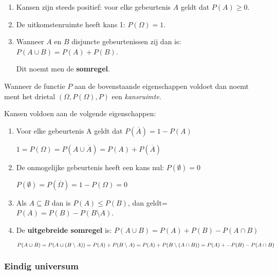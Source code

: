 \documentclass[a4paper,12pt]{article}
\begin{document}
\begin{enumerate}
\item Kansen zijn steeds positief: voor elke gebeurtenis $A$ geldt dat $P(A) \geq 0$.
\item De uitkomstenruimte heeft kans 1: $P(\Omega)=1$.
\item Wanneer $A$ en $B$ disjuncte gebeurtenissen zij dan is: $P(A\cup B)=P(A)+P(B)$.

Dit noemt men de \textbf{somregel}.
\end{enumerate}

Wanneer de functie $P$ aan de bovenstaande eigenschappen voldoet dan noemt ment het drietal $(\Omega, P(\Omega), P)$ een \textit{kansruimte}.

Kansen voldoen aan de volgende eigenschappen:
\begin{enumerate}
\item Voor elke gebeurtenis A geldt dat $P(\overline{A}) = 1-P(A)$

$1 = P(\Omega) = P(A\cup \overline{A}) = P(A) + P(\overline{A})$
\item De onmogelijke gebeurtenis heeft een kans nul: $P(\emptyset)=0$

$P(\emptyset)= P(\overline{\Omega}) = 1 - P(\Omega) = 0$
\item Als $A \subseteq B$ dan is $P(A)\leq P(B)$, dan geldt= $P(A) = P(B) - P(B\setminus A)$.
\item De \textbf{uitgebreide somregel} is: $P(A \cup B) = P(A) + P(B) - P(A \cap B)$

$P(A\cup B) = P(A \cup (B\setminus A))\\
= P(A) + P(B\setminus A)\\
= P(A) + P(B\setminus (A \cap B))\\
= P(A) +- P(B) - P(A \cap B)$
\end{enumerate}
\subsubsection{Eindig universum}
\end{document}
